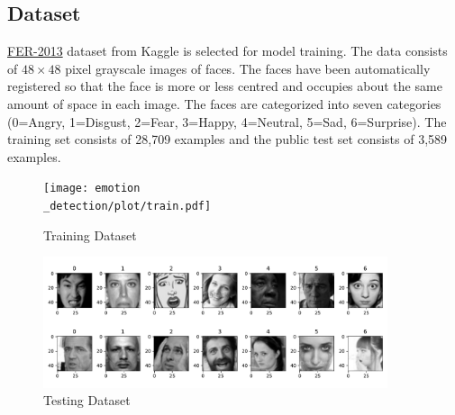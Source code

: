 \documentclass[11pt,a4paper]{article}
\begin{document}
    
    \subsection{Dataset}
    \href{https://www.kaggle.com/datasets/msambare/fer2013}{FER-2013} \cite{FER2013} dataset from Kaggle is selected for model training. The data consists of $48 \times 48$ pixel grayscale images of faces. The faces have been automatically registered so that the face is more or less centred and occupies about the same amount of space in each image. The faces are categorized into seven categories (0=Angry, 1=Disgust, 2=Fear, 3=Happy, 4=Neutral, 5=Sad, 6=Surprise). The training set consists of 28,709 examples and the public test set consists of 3,589 examples. 
    \begin{figure}[H]
        \centering
        \texttt{[image: emotion\\\_detection/plot/train.pdf]}
        \caption{Training Dataset}
        \label{fig:train_dataset}
    \end{figure}
    \begin{figure}[H]
        \centering
        \includegraphics[width = 0.9\textwidth]{emotion_detection/plot/test.pdf}
        \caption{Testing Dataset}
        \label{fig:test_dataset}
    \end{figure}
    
    
\end{document}
